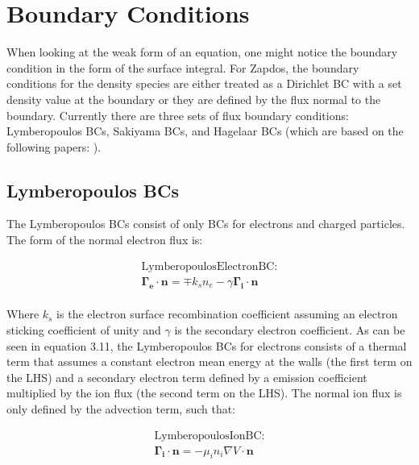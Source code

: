 \documentclass[final]{report}
\begin{document}
  \section{Boundary Conditions}

  When looking at the weak form of an equation, one might notice the boundary condition in the form of the surface integral. For Zapdos, the boundary conditions for the density species are either treated as a Dirichlet BC with a set density value at the boundary or they are defined by the flux normal to the boundary. Currently there are three sets of flux boundary conditions: Lymberopoulos BCs, Sakiyama BCs, and Hagelaar BCs (which are based on the following papers: \cite{1D_GEC,2D_GEC_100mTorr,Hagelaar_BC1,Hagelaar_BC2}).

  \subsection{Lymberopoulos BCs}

  The Lymberopoulos BCs consist of only BCs for electrons and charged particles. The form of the normal electron flux is:

  \begin{equation}
  \begin{gathered}
      \text{LymberopoulosElectronBC:} \\
      \mathbf{\Gamma_{e}}\cdot\mathbf{n}=\mp k_{s}n_{e}-\gamma \mathbf{\Gamma_{i}}\cdot\mathbf{n}
  \end{gathered}
  \end{equation}
  \\
  Where $k_{s}$ is the electron surface recombination coefficient assuming an electron sticking coefficient of unity and $\gamma$ is the secondary electron coefficient. As can be seen in equation 3.11, the Lymberopoulos BCs for electrons consists of a thermal term that assumes a constant electron mean energy at the walls (the first term on the LHS) and a secondary electron term defined by a emission coefficient multiplied by the ion flux (the second term on the LHS). The normal ion flux is only defined by the advection term, such that:

  \begin{equation}
  \begin{gathered}
      \text{LymberopoulosIonBC:} \\
      \mathbf{\Gamma_{i}}\cdot\mathbf{n}=-\mu_{i}n_{i}\nabla V\cdot\mathbf{n}
  \end{gathered}
  \end{equation}
\end{document}
